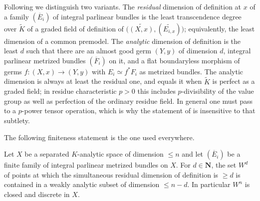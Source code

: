 Following \cite[\S17.6]{CLD25} we distinguish two variants.  The
\emph{residual} dimension of definition at $x$ of a family
$(\overline E_i)$ of integral parlinear bundles is the least transcendence
degree over $\widetilde K$ of a graded field of definition of
$\bigl(\widetilde{(X,x)},(\widetilde{E_{i,x}})\bigr)$; equivalently, the
least dimension of a common premodel.  The \emph{analytic} dimension of
definition is the least $d$ such that there are an almost good germ
$(Y,y)$ of dimension $d$, integral parlinear metrized bundles
$(\overline F_i)$ on it, and a flat boundaryless morphism of germs
$f:(X,x)\to(Y,y)$ with $E_i\simeq f^*F_i$ as metrized bundles.  The
analytic dimension is always at least the residual one, and equals it when
$\widetilde K$ is perfect as a graded field; in residue characteristic
$p>0$ this includes $p$-divisibility of the value group as well as
perfection of the ordinary residue field.  In general one must pass
to a $p$-power tensor operation, which is why the statement of
 is insensitive to that subtlety.

The following finiteness statement is the one used everywhere.

\begin{proposition}
\label{prop:ch17-dimdef-discrete}
Let $X$ be a separated $K$-analytic space of dimension $\le n$ and let
$(\overline E_i)$ be a finite family of integral parlinear metrized
bundles on $X$.  For $d\in\mathbf N$, the set $W^d$ of points at which
the simultaneous residual dimension of definition is $\ge d$ is contained
in a weakly analytic subset of dimension $\le n-d$.  In particular
$W^n$ is closed and discrete in $X$.
\end{proposition}

